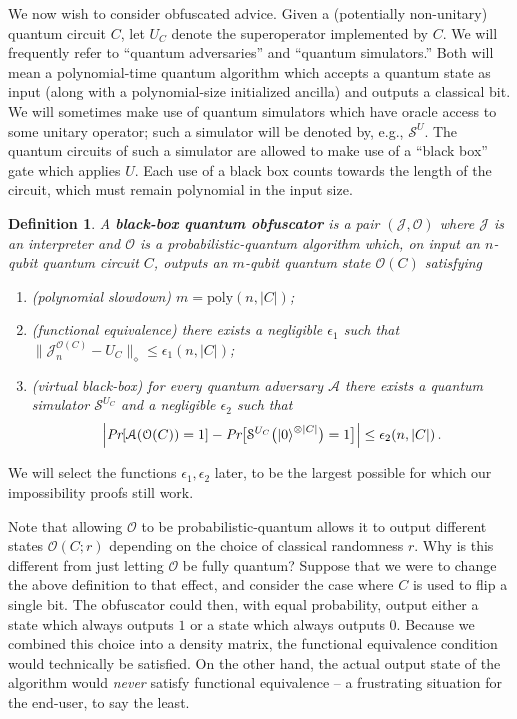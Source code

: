 \documentclass[11pt]{article}
\numberwithin{equation}{section}
\newtheorem{definition}{Definition}
\begin{document}
We now wish to consider obfuscated advice. Given a (potentially non-unitary) quantum circuit $C$, let $U_C$ denote the superoperator implemented by $C$. We will frequently refer to ``quantum adversaries'' and ``quantum simulators.'' Both will mean a polynomial-time quantum algorithm which accepts a quantum state as input (along with a polynomial-size initialized ancilla) and outputs a classical bit. We will sometimes make use of quantum simulators which have oracle access to some unitary operator; such a simulator will be denoted by, e.g.,  $\mathcal S^U$. The quantum circuits of such a simulator are allowed to make use of a ``black box'' gate which applies $U$. Each use of a black box counts towards the length of the circuit, which must remain polynomial in the input size.
\begin{definition}
A \textbf{black-box quantum obfuscator} is a pair $(\mathcal J, \mathcal O)$ where $\mathcal J$ is an interpreter and $\mathcal O$ is a probabilistic-quantum algorithm which, on input an $n$-qubit quantum circuit $C$, outputs an $m$-qubit quantum state $\mathcal O(C)$ satisfying
\begin{enumerate}
\item (polynomial slowdown)  $m = \text{poly}(n, |C|)$;
\item (functional equivalence) there exists a negligible $\epsilon_1$ such that $\bigl\| \mathcal J_n^{\mathcal O(C)} - U_C \bigr\|_\diamond \leq \epsilon_1(n, |C|)$;
\item (virtual black-box) for every quantum adversary $\mathcal A$ there exists a quantum simulator $\mathcal S^{U_C}$ and a negligible $\epsilon_2$ such that
$$
\Bigl| \emph{Pr}[\mathcal A(\mathcal O(C)) = 1] - \emph{Pr}\bigl[\mathcal S^{U_C}\bigl({\left\vert{0}\right\rangle}^{\otimes |C|}\bigr) = 1\bigr] \Bigr| \leq \epsilon_2(n, |C|)\,.
$$
\end{enumerate}
\end{definition}
\noindent We will select the functions $\epsilon_1, \epsilon_2$ later, to be the largest possible for which our impossibility proofs still work.

Note that allowing $\mathcal O$ to be probabilistic-quantum allows it to output different states $\mathcal O(C; r)$ depending on the choice of classical randomness $r$. Why is this different from just letting $\mathcal O$ be fully quantum? Suppose that we were to change the above definition to that effect, and consider the case where $C$ is used to flip a single bit. The obfuscator could then, with equal probability, output either a state which always outputs $1$ or a state which always outputs $0$. Because we combined this choice into a density matrix, the functional equivalence condition would technically be satisfied. On the other hand, the actual output state of the algorithm would \emph{never} satisfy functional equivalence -- a frustrating situation for the end-user, to say the least.
\end{document}
